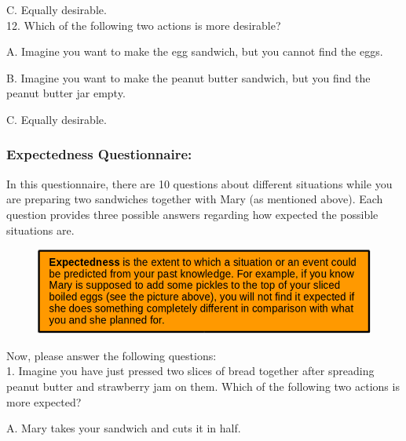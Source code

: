 \documentclass[12pt]{report}
\begin{document}
\begin{appendices}
C. Equally desirable.\\


12. Which of the following two actions is more desirable?

A. Imagine you want to make the egg sandwich, but you cannot find the eggs.

B. Imagine you want to make the peanut butter sandwich, but you find the peanut butter jar empty.

C. Equally desirable.\\

\pagebreak

\subsubsection{Expectedness Questionnaire:}
In this questionnaire, there are 10 questions about different situations while
you are preparing two sandwiches together with Mary (as mentioned above). Each
question provides three possible answers regarding how expected the possible
situations are.


\begin{figure}[tbh]
 \centering
 \includegraphics[width=1\textwidth]{figure/expectedness-definition.png}
\end{figure}

Now, please answer the following questions:\\

1. Imagine you have just pressed two slices of bread together after spreading peanut butter and strawberry jam on them. Which of the following two actions is more expected?

A. Mary takes your sandwich and cuts it in half.


\end{appendices}
\end{document}
